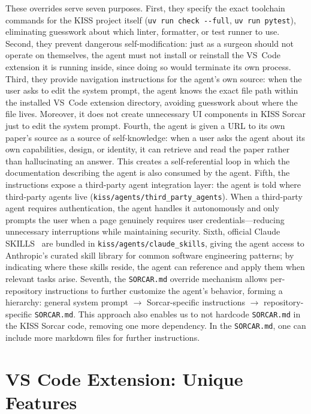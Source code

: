 \documentclass{article}
\begin{document}
These overrides serve seven purposes.  First, they specify the exact toolchain commands for the KISS project itself (\texttt{uv run check -{}-full}, \texttt{uv run pytest}), eliminating guesswork about which linter, formatter, or test runner to use.  Second, they prevent dangerous self-modification: just as a surgeon should not operate on themselves, the agent must not install or reinstall the VS~Code extension it is running inside, since doing so would terminate its own process.  Third, they provide navigation instructions for the agent's own source: when the user asks to edit the system prompt, the agent knows the exact file path within the installed VS~Code extension directory, avoiding guesswork about where the file lives.  Moreover, it does not create unnecessary UI components in KISS Sorcar just to edit the system prompt.  Fourth, the agent is given a URL to its own paper's source as a source of self-knowledge: when a user asks the agent about its own capabilities, design, or identity, it can retrieve and read the paper rather than hallucinating an answer.  This creates a self-referential loop in which the documentation describing the agent is also consumed by the agent.  Fifth, the instructions expose a third-party agent integration layer: the agent is told where third-party agents live (\texttt{kiss/agents/third\_party\_agents}).  When a third-party agent requires authentication, the agent handles it autonomously and only prompts the user when a page genuinely requires user credentials---reducing unnecessary interruptions while maintaining security.  Sixth, official Claude SKILLS~\citep{claudecode2025} are bundled in \texttt{kiss/agents/claude\_skills}, giving the agent access to Anthropic's curated skill library for common software engineering patterns; by indicating where these skills reside, the agent can reference and apply them when relevant tasks arise.  Seventh, the \texttt{SORCAR.md} override mechanism allows per-repository instructions to further customize the agent's behavior, forming a hierarchy: general system prompt $\rightarrow$ Sorcar-specific instructions $\rightarrow$ repository-specific \texttt{SORCAR.md}.  This approach also enables us to not hardcode \texttt{SORCAR.md} in the KISS Sorcar code, removing one more dependency.  In the \texttt{SORCAR.md}, one can include more markdown files for further instructions.

\section{VS Code Extension: Unique Features}
\label{sec:vscode-features}
\end{document}
